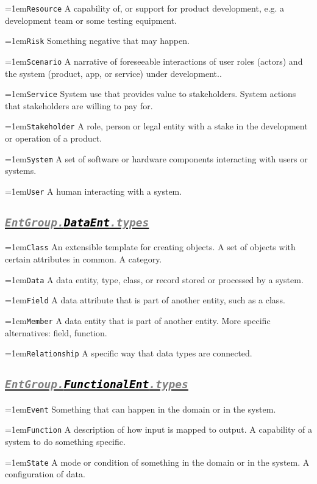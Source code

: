 \documentclass[a4paper,oneside]{article}
\newcommand\Concept[2]{\hangindent=1em\lstinline+#1+ #2}
\begin{document}
\begin{multicols*}{4}
\Concept{Resource}{A capability of, or support for product development, e.g. a development team or some testing equipment.}

\Concept{Risk}{Something negative that may happen.}

\Concept{Scenario}{A narrative of foreseeable interactions of user roles (actors) and the system (product, app, or service) under development..}

\Concept{Service}{System use that provides value to stakeholders. System actions that stakeholders are willing to pay for.}

\Concept{Stakeholder}{A role, person or legal entity with a stake in the development or operation of a product.}

\Concept{System}{A set of software or hardware components interacting with users or systems.}

\Concept{User}{A human interacting with a system.}


\subsection*{\underline{\texttt{\textit{{\textcolor{gray}{EntGroup.}\textcolor{black}{DataEnt}}\textcolor{gray}{.types}}}}}
\Concept{Class}{An extensible template for creating objects. A set of objects with certain attributes in common. A category.}

\Concept{Data}{A data entity, type, class, or record stored or processed by a system.}

\Concept{Field}{A data attribute that is part of another entity, such as a class.}

\Concept{Member}{A data entity that is part of another entity. More specific alternatives: field, function.}

\Concept{Relationship}{A specific way that data types are connected.}


\subsection*{\underline{\texttt{\textit{{\textcolor{gray}{EntGroup.}\textcolor{black}{FunctionalEnt}}\textcolor{gray}{.types}}}}}
\Concept{Event}{Something that can happen in the domain or in the system.}

\Concept{Function}{A description of how input is mapped to output. A capability of a system to do something specific.}

\Concept{State}{A mode or condition of something in the domain or in the system. A configuration of data.}


\end{multicols*}
\end{document}
